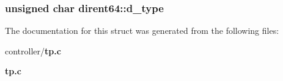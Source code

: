 \subsubsection[{d\_\-type}]{\setlength{\rightskip}{0pt plus 5cm}unsigned char {\bf dirent64::d\_\-type}}\label{structdirent64_a4228c87afd910baab45a45ce745df789}


The documentation for this struct was generated from the following files:\begin{DoxyCompactItemize}
\item 
controller/{\bf tp.c}\item 
{\bf tp.c}\end{DoxyCompactItemize}
